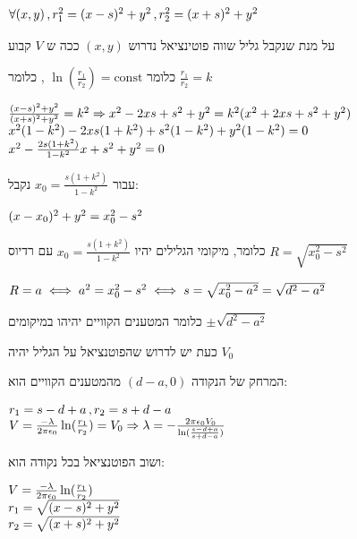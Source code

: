 \documentclass[14pt]{extarticle}
\makeatletter
\newenvironment{lefteqs}{%
    \begin{english}%
    \begin{flushleft}%
    \renewcommand{\arraystretch}{1.3}%
    $\begin{array}{@{}l@{}}%
}{%
    \end{array}$%
    \end{flushleft}%
    \end{english}%
}
\makeatother
\begin{document}
\begin{lefteqs}
    \forall (x,y) \, , r_1^2=(x-s)^2 + y^2 \, , r_2^2=(x+s)^2 + y^2 \\
\end{lefteqs}
על מנת שנקבל גליל שווה פוטינציאל נדרוש $(x,y)$ ככה ש $V$ קבוע

כלומר $\ln(\frac{r_1}{r_2})=\text{const}$ , כלומר $\frac{r_1}{r_2}=k$

\begin{lefteqs}
    \frac{(x-s)^2 + y^2}{(x+s)^2 + y^2} = k^2 \Rightarrow x^2 -2xs + s^2 +y^2 = k^2(x^2 + 2xs + s^2 + y^2) \\
    x^2(1-k^2) -2xs(1+k^2) + s^2(1-k^2) + y^2(1-k^2) = 0 \\
    x^2 - \frac{2s(1+k^2)}{1-k^2}x + s^2 + y^2 = 0 \\
\end{lefteqs}

עבור $x_0=\frac{s(1+k^2)}{1-k^2}$ נקבל:

\begin{lefteqs}
    (x-x_0)^2 + y^2 = x_0^2 - s^2
\end{lefteqs}

כלומר, מיקומי הגלילים יהיו $x_0=\frac{s(1+k^2)}{1-k^2}$ עם רדיוס $R=\sqrt{x_0^2 - s^2}$

\begin{lefteqs}
    R=a \iff a^2=x_0^2-s^2 \iff s=\sqrt{x_0^2-a^2} = \sqrt{d^2-a^2}
\end{lefteqs}

כלומר המטענים הקוויים יהיהו במיקומים $\pm \sqrt{d^2-a^2}$

כעת יש לדרוש שהפוטנציאל על הגליל יהיה $V_0$

המרחק של הנקודה $(d-a,0)$ מהמטענים הקוויים הוא:

\begin{lefteqs}
    r_1 = s-d+a \, , r_2 = s+d-a  \\
    V=\frac{-\lambda}{2\pi \epsilon_0} \ln(\frac{r_1}{r_2}) = V_0 \Rightarrow \lambda = -\frac{2\pi \epsilon_0 V_0}{\ln(\frac{s-d+a}{s+d-a})}
\end{lefteqs}

ושוב הפוטנציאל בכל נקודה הוא:

\begin{lefteqs}
    V=\frac{-\lambda}{2\pi \epsilon_0} \ln(\frac{r_1}{r_2}) \\
    r_1 = \sqrt{(x-s)^2 + y^2} \\
    r_2 = \sqrt{(x+s)^2 + y^2} \\
\end{lefteqs}
\end{document}

